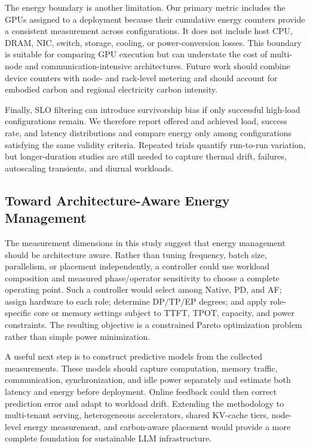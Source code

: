 The energy boundary is another limitation. Our primary metric includes the GPUs assigned to a deployment because their cumulative energy counters provide a consistent measurement across configurations. It does not include host CPU, DRAM, NIC, switch, storage, cooling, or power-conversion losses. This boundary is suitable for comparing GPU execution but can understate the cost of multi-node and communication-intensive architectures. Future work should combine device counters with node- and rack-level metering and should account for embodied carbon and regional electricity carbon intensity.

Finally, SLO filtering can introduce survivorship bias if only successful high-load configurations remain. We therefore report offered and achieved load, success rate, and latency distributions and compare energy only among configurations satisfying the same validity criteria. Repeated trials quantify run-to-run variation, but longer-duration studies are still needed to capture thermal drift, failures, autoscaling transients, and diurnal workloads.

\subsection{Toward Architecture-Aware Energy Management}
\label{sec:discussion-future}

The measurement dimensions in this study suggest that energy management should be architecture aware. Rather than tuning frequency, batch size, parallelism, or placement independently, a controller could use workload composition and measured phase/operator sensitivity to choose a complete operating point. Such a controller would select among Native, PD, and AF; assign hardware to each role; determine DP/TP/EP degrees; and apply role-specific core or memory settings subject to TTFT, TPOT, capacity, and power constraints. The resulting objective is a constrained Pareto optimization problem rather than simple power minimization.

A useful next step is to construct predictive models from the collected measurements. These models should capture computation, memory traffic, communication, synchronization, and idle power separately and estimate both latency and energy before deployment. Online feedback could then correct prediction error and adapt to workload drift. Extending the methodology to multi-tenant serving, heterogeneous accelerators, shared KV-cache tiers, node-level energy measurement, and carbon-aware placement would provide a more complete foundation for sustainable LLM infrastructure.
